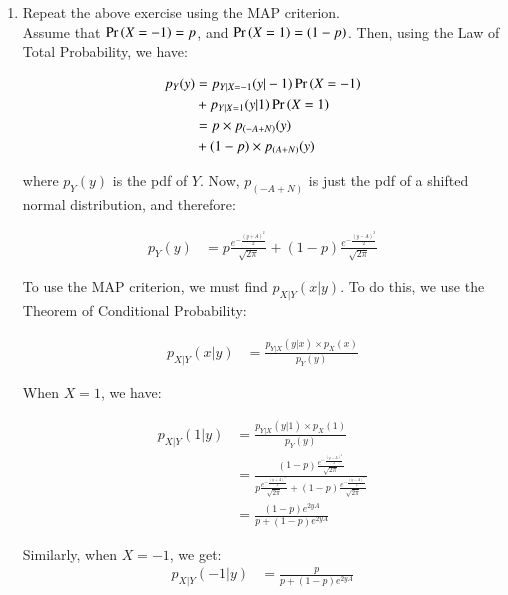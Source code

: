 \documentclass[journal,12pt,twocolumn]{IEEEtran}
\renewcommand\thesection{\arabic{section}}
\begin{document}
\begin{enumerate}[label=\thesection.\arabic*
    ,ref=\thesection.\theenumi]
 \begin{align}
    \ln{p} - \frac{(\delta - A)^2}{2} &= \ln{1-p} + \frac{(\delta + A)^2}{2} \\
    \implies \delta &= \frac{1}{2A} \ln{\frac{1-p}{p}}
 \end{align}



    \item Repeat the above exercise using the MAP criterion.
\\
\solution
Assume that $\Pr\left(X = -1\right) = p$, and $\Pr\left(X = 1\right) = (1-p)$. Then, using the Law of Total Probability,
we have:

\begin{align}
\nonumber p_Y(y) &= p_{Y|X = -1}(y|-1) \Pr\left(X = -1\right) \\
&+ p_{Y| X = 1}(y|1) \Pr\left(X = 1\right) \\
\nonumber &= p \times p_{(-A + N)}(y) \\
&+ (1-p) \times p_{(A+N)} (y) 
\end{align}
 
where $p_Y(y)$ is the pdf of $Y$. Now, $p_{(-A + N)}$ is just the pdf of a shifted
normal distribution, and therefore:

\begin{align}
    p_Y(y) &=  p \frac{e^{-\frac{(y+A)^2}{2}}}{\sqrt{2\pi}} + \left(1-p\right) \frac{e^{-\frac{(y-A)^2}{2}}}{\sqrt{2\pi}}
\end{align}

To use the MAP criterion, we must find $p_{X|Y}(x|y)$. To do this, we use the Theorem of Conditional Probability:

\begin{align}
    p_{X|Y}(x|y) &= \frac{p_{Y|X}(y|x) \times p_X(x)}{p_Y(y)}
\end{align}

When $X=1$, we have:

\begin{align}
    p_{X|Y}(1|y) &= \frac{p_{Y|X}(y|1) \times p_X(1)}{p_Y(y)} \\
    &= \frac{\left(1-p\right) \frac{e^{-\frac{(y-A)^2}{2}}}{\sqrt{2\pi}}}{ p \frac{e^{-\frac{(y+A)^2}{2}}}{\sqrt{2\pi}} + \left(1-p\right) \frac{e^{-\frac{(y-A)^2}{2}}}{\sqrt{2\pi}}} \\
    &= \frac{\left(1-p\right) e^{2yA}}{p + \left(1-p\right) e^{2yA}}
\end{align}

Similarly, when $X = -1$, we get:
\begin{align}
    p_{X|Y}(-1|y) &= \frac{p}{p + \left(1-p\right) e^{2yA}} 
\end{align}


\end{enumerate}
\end{document}
